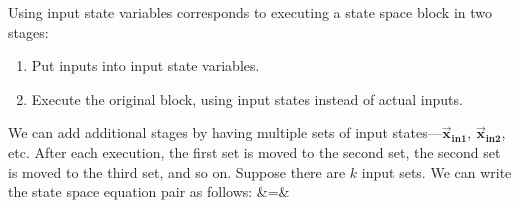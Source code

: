 
Using input state variables corresponds to executing a state space
block in two stages:
\begin{enumerate}
\vspace{\itemshrink} \item Put inputs into input state variables.

\vspace{\itemshrink} \item Execute the original block, using input states instead of
actual inputs.
\vspace{\itemshrink} \end{enumerate}

We can add additional stages by having multiple sets of input
states---$\vec{\mathbf{x}}_{{\mathbf{in1}}}$,
$\vec{\mathbf{x}}_{{\mathbf{in2}}}$, etc.  After each execution, the
first set is moved to the second set, the second set is moved to the
third set, and so on.  Suppose there are $k$ input sets. We can write
the state space equation pair as follows: \starteqnstar {} &\hspace{-6pt}=\hspace{-6pt}&  
